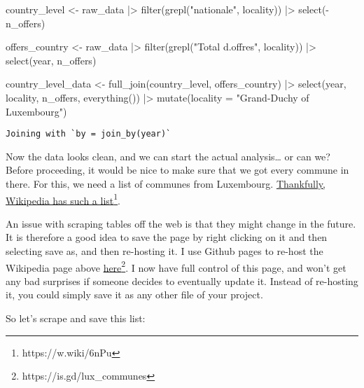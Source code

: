 \documentclass[
  letterpaper,
  DIV=11,
  numbers=noendperiod]{scrartcl}
\newenvironment{Shaded}{\begin{snugshade}}{\end{snugshade}}
\newcommand{\AttributeTok}[1]{\textcolor[rgb]{0.40,0.45,0.13}{#1}}
\newcommand{\FunctionTok}[1]{\textcolor[rgb]{0.28,0.35,0.67}{#1}}
\newcommand{\NormalTok}[1]{\textcolor[rgb]{0.00,0.23,0.31}{#1}}
\newcommand{\OtherTok}[1]{\textcolor[rgb]{0.00,0.23,0.31}{#1}}
\newcommand{\SpecialCharTok}[1]{\textcolor[rgb]{0.37,0.37,0.37}{#1}}
\newcommand{\StringTok}[1]{\textcolor[rgb]{0.13,0.47,0.30}{#1}}
\begin{document}
\begin{Shaded}
\begin{Highlighting}[]
\NormalTok{country\_level }\OtherTok{\textless{}{-}}\NormalTok{ raw\_data }\SpecialCharTok{|\textgreater{}}
  \FunctionTok{filter}\NormalTok{(}\FunctionTok{grepl}\NormalTok{(}\StringTok{"nationale"}\NormalTok{, locality)) }\SpecialCharTok{|\textgreater{}}
  \FunctionTok{select}\NormalTok{(}\SpecialCharTok{{-}}\NormalTok{n\_offers)}

\NormalTok{offers\_country }\OtherTok{\textless{}{-}}\NormalTok{ raw\_data }\SpecialCharTok{|\textgreater{}}
  \FunctionTok{filter}\NormalTok{(}\FunctionTok{grepl}\NormalTok{(}\StringTok{"Total d.offres"}\NormalTok{, locality)) }\SpecialCharTok{|\textgreater{}}
  \FunctionTok{select}\NormalTok{(year, n\_offers)}

\NormalTok{country\_level\_data }\OtherTok{\textless{}{-}} \FunctionTok{full\_join}\NormalTok{(country\_level, offers\_country) }\SpecialCharTok{|\textgreater{}}
  \FunctionTok{select}\NormalTok{(year, locality, n\_offers, }\FunctionTok{everything}\NormalTok{()) }\SpecialCharTok{|\textgreater{}}
  \FunctionTok{mutate}\NormalTok{(}\AttributeTok{locality =} \StringTok{"Grand{-}Duchy of Luxembourg"}\NormalTok{)}
\end{Highlighting}
\end{Shaded}

\begin{verbatim}
Joining with `by = join_by(year)`
\end{verbatim}

Now the data looks clean, and we can start the actual analysis\ldots{}
or can we? Before proceeding, it would be nice to make sure that we got
every commune in there. For this, we need a list of communes from
Luxembourg.
\href{https://en.wikipedia.org/wiki/List_of_communes_of_Luxembourg}{Thankfully,
Wikipedia has such a list}\footnote{https://w.wiki/6nPu}.

An issue with scraping tables off the web is that they might change in
the future. It is therefore a good idea to save the page by right
clicking on it and then selecting save as, and then re-hosting it. I use
Github pages to re-host the Wikipedia page above
\href{https://b-rodrigues.github.io/list_communes/}{here}\footnote{https://is.gd/lux\_communes}.
I now have full control of this page, and won't get any bad surprises if
someone decides to eventually update it. Instead of re-hosting it, you
could simply save it as any other file of your project.

So let's scrape and save this list:
\end{document}
